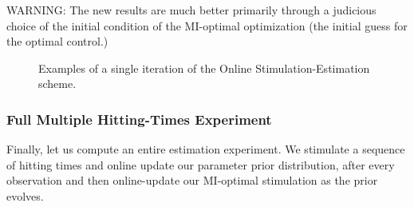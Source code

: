 \documentclass{article}
\begin{document}
WARNING: The new results are much better primarily through a judicious choice of
the initial condition of the MI-optimal optimization (the initial guess for the
optimal control.)

\begin{figure}[h]
\begin{center}
\caption[Effect of the First Observation on the Belief
Distribution]{Examples of a single iteration of the Online Stimulation-Estimation scheme.}
\label{fig:example_online_miopt_single_iteration}
\end{center}
\end{figure}

\subsubsection{Full Multiple Hitting-Times Experiment}
Finally, let us compute an entire estimation experiment. We stimulate a sequence
of hitting times and online update our parameter prior distribution, after
every observation and then online-update our MI-optimal stimulation as the
prior evolves.

 
\end{document}

